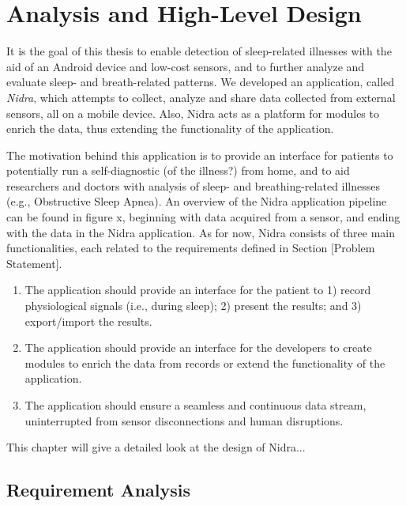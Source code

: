 
\chapter{Analysis and High-Level Design}

It is the goal of this thesis to enable detection of sleep-related illnesses 
with the aid of an Android device and low-cost sensors, and to further analyze 
and evaluate sleep- and breath-related patterns. We developed an application, 
called \textit{Nidra}, which attempts to collect, analyze and share data collected 
from external sensors, all on a mobile device. Also, Nidra acts as a platform for 
modules to enrich the data, thus extending the functionality of the application.

The motivation behind this application is to provide an interface for patients 
to potentially run a self-diagnostic (of the illness?) from home, and to aid 
researchers and doctors with analysis of sleep- and breathing-related illnesses 
(e.g., Obstructive Sleep Apnea). An overview of the Nidra application pipeline 
can be found in figure x, beginning with data acquired from a sensor, and ending 
with the data in the Nidra application. As for now, Nidra consists of three 
main functionalities, each related to the requirements defined in Section [Problem Statement]. 

\begin{enumerate}
    \item The application should provide an interface for the patient to 1) record physiological signals (i.e., during sleep); 2) present the results; and 3) export/import the results.
    \item The application should provide an interface for the developers to create modules to enrich the data from records or extend the functionality of the application. 
    \item The application should ensure a seamless and continuous data stream, uninterrupted from sensor disconnections and human disruptions.
\end{enumerate}

This chapter will give a detailed look at the design of Nidra...

\section{Requirement Analysis}



%

